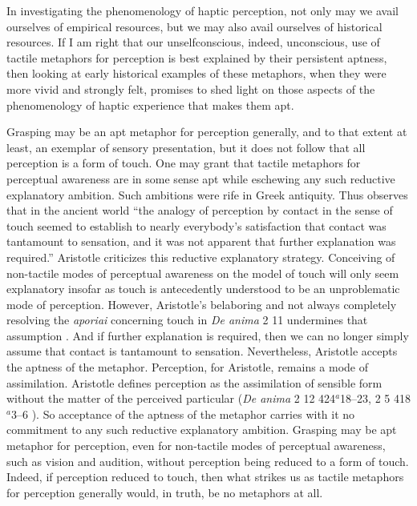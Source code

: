 In investigating the phenomenology of haptic perception, not only may we avail ourselves of empirical resources, but we may also avail ourselves of historical resources. If I am right that our unselfconscious, indeed, unconscious, use of tactile metaphors for perception is best explained by their persistent aptness, then looking at early historical examples of these metaphors, when they were more vivid and strongly felt, promises to shed light on those aspects of the phenomenology of haptic experience that makes them apt. 

Grasping may be an apt metaphor for perception generally, and to that extent at least, an exemplar of sensory presentation, but it does not follow that all perception is a form of touch. One may grant that tactile metaphors for perceptual awareness are in some sense apt while eschewing any such reductive explanatory ambition. Such ambitions were rife in Greek antiquity. Thus \citet[39]{Lindberg:1977aa} observes that in the ancient world ``the analogy of perception by contact in the sense of touch seemed to establish to nearly everybody’s satisfaction that contact was tantamount to sensation, and it was not apparent that further explanation was required.'' Aristotle criticizes this reductive explanatory strategy. Conceiving of non-tactile modes of perceptual awareness on the model of touch will only seem explanatory insofar as touch is antecedently understood to be an unproblematic mode of perception. However, Aristotle's belaboring and not always completely resolving the \emph{aporiai} concerning touch in \emph{De anima} 2 11 undermines that assumption \citep{Derrida:2005aa,Kalderon:2015fr}. And if further explanation is required, then we can no longer simply assume that contact is tantamount to sensation. Nevertheless, Aristotle accepts the aptness of the metaphor. Perception, for Aristotle, remains a mode of assimilation. Aristotle defines perception as the assimilation of sensible form without the matter of the perceived particular (\emph{De anima} 2 12 424\( ^{a} \)18–23, 2 5 418\( ^{a} \)3–6 ). So acceptance of the aptness of the metaphor carries with it no commitment to any such reductive explanatory ambition. Grasping may be apt metaphor for perception, even for non-tactile modes of perceptual awareness, such as vision and audition, without perception being reduced to a form of touch. Indeed, if perception reduced to touch, then what strikes us as tactile metaphors for perception generally would, in truth, be no metaphors at all.

